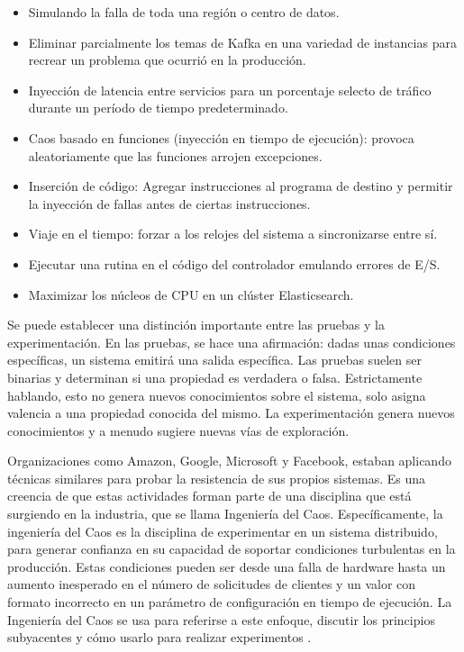 \begin{itemize}
    \item Simulando la falla de toda una región o centro de datos.
    \item Eliminar parcialmente los temas de Kafka en una variedad de instancias para recrear un problema que ocurrió en la producción.
    \item Inyección de latencia entre servicios para un porcentaje selecto de tráfico durante un período de tiempo predeterminado.
    \item Caos basado en funciones (inyección en tiempo de ejecución): provoca aleatoriamente que las funciones arrojen excepciones.
    \item Inserción de código: Agregar instrucciones al programa de destino y permitir la inyección de fallas antes de ciertas instrucciones.
    \item Viaje en el tiempo: forzar a los relojes del sistema a sincronizarse entre sí.
    \item Ejecutar una rutina en el código del controlador emulando errores de E/S.
    \item Maximizar los núcleos de CPU en un clúster Elasticsearch.
\end{itemize}

\par Se puede establecer una distinción importante entre las pruebas y la experimentación. En las pruebas, se hace una afirmación: dadas unas condiciones específicas, un sistema emitirá una salida específica. Las pruebas suelen ser binarias y determinan si una propiedad es verdadera o falsa. Estrictamente hablando, esto no genera nuevos conocimientos sobre el sistema, solo asigna valencia a una propiedad conocida del mismo. La experimentación genera nuevos conocimientos y a menudo sugiere nuevas vías de exploración.\\

\par Organizaciones como Amazon, Google, Microsoft y Facebook, estaban aplicando técnicas similares para probar la resistencia de sus propios sistemas. Es una creencia de que estas actividades forman parte de una disciplina que está surgiendo en la industria, que se llama Ingeniería del Caos. Específicamente, la ingeniería del Caos es la disciplina de experimentar en un sistema distribuido, para generar confianza en su capacidad de soportar condiciones turbulentas en la producción. Estas condiciones pueden ser desde una falla de hardware hasta un aumento inesperado en el número de solicitudes de clientes y un valor con formato incorrecto en un parámetro de configuración en tiempo de ejecución. La Ingeniería del Caos se usa para referirse a este enfoque, discutir los principios subyacentes y cómo usarlo para realizar experimentos \cite{LIB02}.\\
